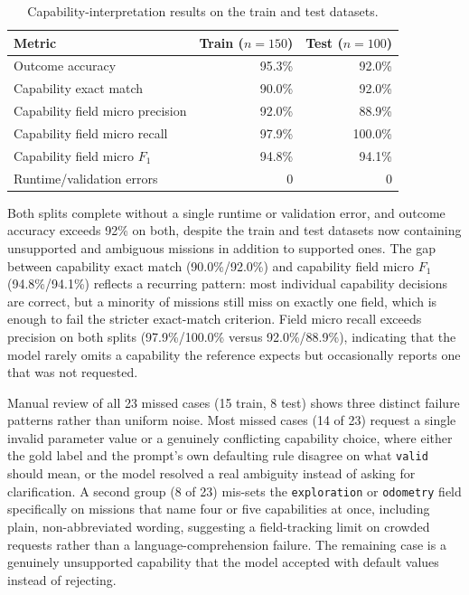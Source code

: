 \begin{table}[H]
\centering
\caption{Capability-interpretation results on the train and test datasets.}
\label{tab:capability-reasoning-results}
\begin{tabular}{lrr}
\toprule
Metric & Train ($n=150$) & Test ($n=100$) \\
\midrule
Outcome accuracy & 95.3\% & 92.0\% \\
Capability exact match & 90.0\% & 92.0\% \\
Capability field micro precision & 92.0\% & 88.9\% \\
Capability field micro recall & 97.9\% & 100.0\% \\
Capability field micro $F_1$ & 94.8\% & 94.1\% \\
Runtime/validation errors & 0 & 0 \\
\bottomrule
\end{tabular}
\end{table}

Both splits complete without a single runtime or validation error, and outcome accuracy exceeds 92\% on both, despite the train and test datasets now containing unsupported and ambiguous missions in addition to supported ones. The gap between capability exact match (90.0\%/92.0\%) and capability field micro $F_1$ (94.8\%/94.1\%) reflects a recurring pattern: most individual capability decisions are correct, but a minority of missions still miss on exactly one field, which is enough to fail the stricter exact-match criterion. Field micro recall exceeds precision on both splits (97.9\%/100.0\% versus 92.0\%/88.9\%), indicating that the model rarely omits a capability the reference expects but occasionally reports one that was not requested.

Manual review of all 23 missed cases (15 train, 8 test) shows three distinct failure patterns rather than uniform noise. Most missed cases (14 of 23) request a single invalid parameter value or a genuinely conflicting capability choice, where either the gold label and the prompt's own defaulting rule disagree on what \texttt{valid} should mean, or the model resolved a real ambiguity instead of asking for clarification. A second group (8 of 23) mis-sets the \texttt{exploration} or \texttt{odometry} field specifically on missions that name four or five capabilities at once, including plain, non-abbreviated wording, suggesting a field-tracking limit on crowded requests rather than a language-comprehension failure. The remaining case is a genuinely unsupported capability that the model accepted with default values instead of rejecting.

